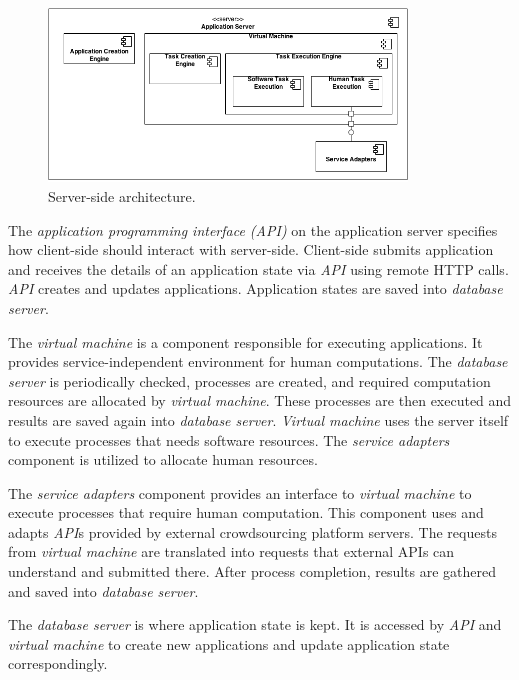 \begin{figure}[ht]
	\centering
	\includegraphics[width=0.85\textwidth]{figures/architecture/CC3.png}
	\caption{Server-side architecture.}
	\label{fig:serverdecomposition}
\end{figure}

The \textit{application programming interface (API)} on the application server 
specifies how client-side should interact with server-side. Client-side submits 
application and receives the details of an application state via \textit{API} using 
remote HTTP calls. \textit{API} creates and updates applications. Application 
states are saved into \textit{database server}.

The \textit{virtual machine} is a component responsible for executing applications. 
It provides service-independent environment for human computations. The 
\textit{database server} is periodically checked, processes are created, and 
required computation resources are allocated by \textit{virtual machine}. These 
processes are then executed and results are saved again into \textit{database server}. 
\textit{Virtual machine} uses the server itself to execute processes that needs 
software resources. The \textit{service adapters} component is utilized to allocate 
human resources.

The \textit{service adapters} component provides an interface to \textit{virtual machine} 
to execute processes that require human computation. This component uses and 
adapts \textit{API}s provided by external crowdsourcing platform servers. The requests 
from \textit{virtual machine} are translated into requests that external APIs can 
understand and submitted there. After process completion, results are gathered and 
saved into \textit{database server}.

The \textit{database server} is where application state is kept. It is accessed by 
\textit{API} and \textit{virtual machine} to create new applications and update 
application state correspondingly.

